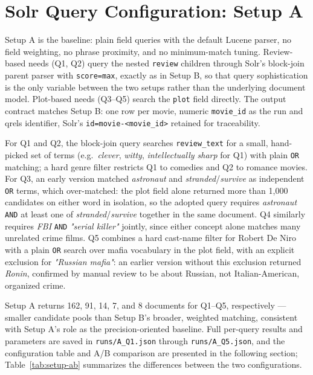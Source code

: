 
\section{Solr Query Configuration: Setup A}

Setup A is the baseline: plain field queries with the default Lucene parser, no
field weighting, no phrase proximity, and no minimum-match tuning. Review-based
needs (Q1, Q2) query the nested \texttt{review} children through Solr's block-join
parent parser with \texttt{score=max}, exactly as in Setup B, so that query
sophistication is the only variable between the two setups rather than the
underlying document model. Plot-based needs (Q3--Q5) search the \texttt{plot} field
directly. The output contract matches Setup B: one row per movie, numeric
\texttt{movie\_id} as the run and qrels identifier, Solr's \texttt{id=movie-<movie\_id>}
retained for traceability.

For Q1 and Q2, the block-join query searches \texttt{review\_text} for a small,
hand-picked set of terms (e.g.\ \textit{clever}, \textit{witty},
\textit{intellectually sharp} for Q1) with plain \texttt{OR} matching; a hard genre
filter restricts Q1 to comedies and Q2 to romance movies. For Q3, an early version
matched \textit{astronaut} and \textit{stranded}/\textit{survive} as independent
\texttt{OR} terms, which over-matched: the plot field alone returned more than
1{,}000 candidates on either word in isolation, so the adopted query requires
\textit{astronaut} \texttt{AND} at least one of \textit{stranded}/\textit{survive}
together in the same document. Q4 similarly requires \textit{FBI} \texttt{AND}
\textit{"serial killer"} jointly, since either concept alone matches many unrelated
crime films. Q5 combines a hard cast-name filter for Robert De Niro with a plain
\texttt{OR} search over mafia vocabulary in the plot field, with an explicit
exclusion for \textit{"Russian mafia"}: an earlier version without this exclusion
returned \textit{Ronin}, confirmed by manual review to be about Russian, not
Italian-American, organized crime.

Setup A returns 162, 91, 14, 7, and 8 documents for Q1--Q5, respectively ---
smaller candidate pools than Setup B's broader, weighted matching, consistent with
Setup A's role as the precision-oriented baseline. Full per-query results and
parameters are saved in \texttt{runs/A\_Q1.json} through \texttt{runs/A\_Q5.json},
and the configuration table and A/B comparison are presented in the following
section; Table~\ref{tab:setup-ab} summarizes the differences between the two
configurations.
